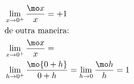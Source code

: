 \begin{ex}
\begin{align}
&\lim_{x\rightarrow 0^+} \frac{\mo x}{x} =+1\nonumber\\
&\text{de outra maneira:}\nonumber\\
&\lim_{x\rightarrow 0^+} \frac{\mo x}{x}=\nonumber\\
&\lim_{h\rightarrow 0^+} \frac{\mo {0+h}}{0+h}=\lim_{h\rightarrow 0} \frac{\mo h}{h}=1\nonumber
\end{align}
\end{ex}